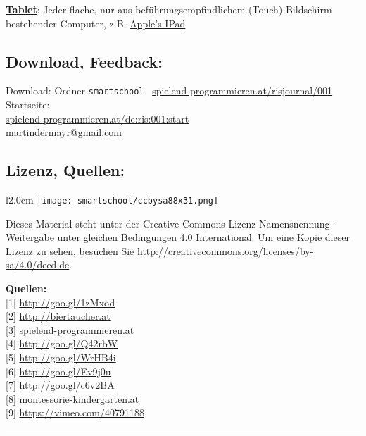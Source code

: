 \documentclass[10pt,a4paper,ngerman,twoside]{article} %
\newcommand{\SepRule}{\noindent	%
\begin{center}
\rule{250pt}{1pt} %
\end{center}
}
\begin{document}
\href{https://de.wikipedia.org/wiki/Tablet-Computer}{\textbf{Tablet}}: Jeder flache, nur aus beführungsempfindlichem (Touch)-Bildschirm bestehender Computer, z.B. \href{https://de.wikipedia.org/wiki/Apple_iPad}{Apple's IPad}


\subsection*{Download, Feedback:}
\footnotesize{
Download: Ordner \texttt{smartschool} \Mundus\ \href{http://spielend-programmieren.at/risjournal/001}{spielend-programmieren.at/risjournal/001}\\
Startseite:\\
\href{http://spielend-programmieren.at/de:ris:001:start}{spielend-programmieren.at/de:ris:001:start}\\ 
\Letter\: martindermayr@gmail.com\\}
\normalsize 

\subsection*{Lizenz, Quellen:}
\begin{wrapfigure}{l}{2.0cm}
\texttt{[image: smartschool/ccbysa88x31.png]}
\end{wrapfigure}
Dieses Material steht unter der Creative-Commons-Lizenz Namensnennung - Weitergabe unter gleichen Bedingungen 4.0 International. Um eine Kopie dieser Lizenz zu sehen, besuchen Sie \url{http://creativecommons.org/licenses/by-sa/4.0/deed.de}.

\textbf{Quellen:} \\
{[}1{]} \url{http://goo.gl/1zMxod} \\
{[}2{]} \url{http://biertaucher.at} \\
{[}3{]} \href{http://spielend-programmieren.at}{spielend-programmieren.at} \\
{[}4{]} \url{http://goo.gl/Q42rbW} \\
{[}5{]} \url{http://goo.gl/WrHB4i} \\
{[}6{]} \url{http://goo.gl/Ev9j0u} \\
{[}7{]} \url{http://goo.gl/c6v2BA} \\
{[}8{]} \href{http://www.montessori-kindergarten.at/}{montessorie-kindergarten.at} \\
{[}9{]} \url{https://vimeo.com/40791188} 



\SepRule
\end{document}

